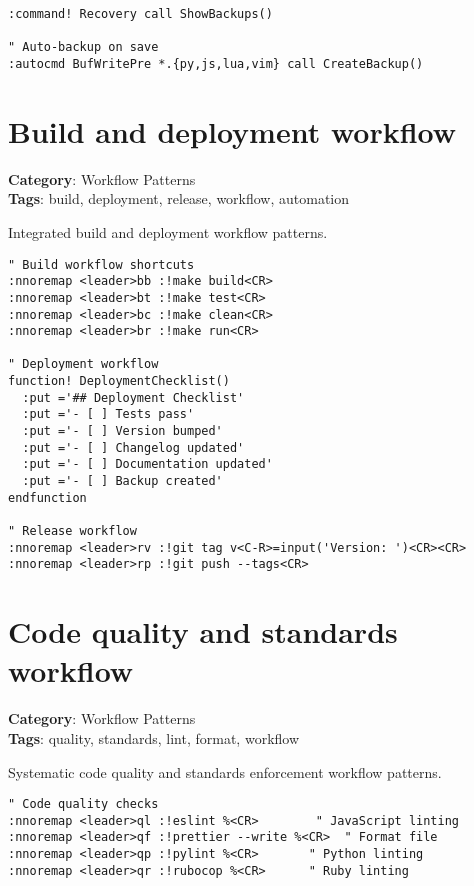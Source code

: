 {{{{{{{{{{{{{{{{{{\begin{Exa*}{}
\begin{Verbatim}[fontsize=\footnotesize, breaklines, breakanywhere]
:command! Recovery call ShowBackups()

" Auto-backup on save
:autocmd BufWritePre *.{py,js,lua,vim} call CreateBackup()
\end{Verbatim}
\end{Exa*}

\section{Build and deployment workflow}

\textbf{Category}: Workflow Patterns\\ \textbf{Tags}: build, deployment, release, workflow, automation
\vspace{0.5cm}

Integrated build and deployment workflow patterns.

\begin{Exa*}{}
\begin{Verbatim}[fontsize=\footnotesize, breaklines, breakanywhere]
" Build workflow shortcuts
:nnoremap <leader>bb :!make build<CR>
:nnoremap <leader>bt :!make test<CR>
:nnoremap <leader>bc :!make clean<CR>
:nnoremap <leader>br :!make run<CR>

" Deployment workflow
function! DeploymentChecklist()
  :put ='## Deployment Checklist'
  :put ='- [ ] Tests pass'
  :put ='- [ ] Version bumped'
  :put ='- [ ] Changelog updated'
  :put ='- [ ] Documentation updated'
  :put ='- [ ] Backup created'
endfunction

" Release workflow
:nnoremap <leader>rv :!git tag v<C-R>=input('Version: ')<CR><CR>
:nnoremap <leader>rp :!git push --tags<CR>
\end{Verbatim}
\end{Exa*}

\section{Code quality and standards workflow}

\textbf{Category}: Workflow Patterns\\ \textbf{Tags}: quality, standards, lint, format, workflow
\vspace{0.5cm}

Systematic code quality and standards enforcement workflow patterns.

\begin{Exa*}{}
\begin{Verbatim}[fontsize=\footnotesize, breaklines, breakanywhere]
" Code quality checks
:nnoremap <leader>ql :!eslint %<CR>        " JavaScript linting
:nnoremap <leader>qf :!prettier --write %<CR>  " Format file
:nnoremap <leader>qp :!pylint %<CR>       " Python linting
:nnoremap <leader>qr :!rubocop %<CR>      " Ruby linting


\end{Verbatim}
\end{Exa*}}}}}}}}}}}}}}}}}}}
